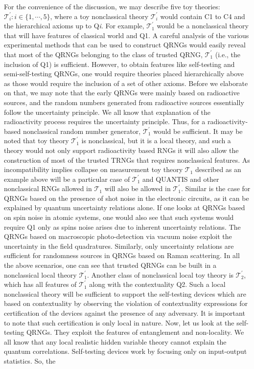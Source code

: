 \documentclass[]{interact}
\theoremstyle{plain}%
\theoremstyle{definition}
\theoremstyle{remark}
\begin{document}
 For the convenience of the discussion, we may describe five toy theories: $\mathcal{T}_{i}^{\prime}:i\in\{1,\cdots,5\}$, where a toy nonclassical theory  $\mathcal{T}_{i}^{\prime}$ would contain C1 to C4 and the hierarchical axioms up to Q\textit{i}. For example, $\mathcal{T}_{1}^{\prime}$ would be a nonclassical theory that will have features of classical world and Q1. A careful analysis of the various experimental methods that can be used to construct QRNGs would easily reveal that most of the QRNGs belonging to the class of trusted QRNG, $\mathcal{T}_{1}^{\prime}$ (i.e., the inclusion of Q1)  is sufficient. However, to obtain features like self-testing and semi-self-testing QRNGs, one would require theories placed hierarchically above as those would require the inclusion of a set of other axioms. Before we elaborate on that, we may note that the early QRNGs were mainly based on radioactive sources, and the random numbers generated from radioactive sources essentially follow the uncertainty principle. We all know that explanation of the radioactivity process requires the uncertainty principle. Thus, for a radioactivity-based nonclassical random number generator,  $\mathcal{T}_{1}^{\prime}$ would be sufficient. It may be noted that toy theory $\mathcal{T}_{1}^{\prime}$ is nonclassical, but it is a local theory, and such a theory would not only support radioactivity based RNGs it will also allow the construction of most of the trusted TRNGs that requires nonclassical features. As incompatibility implies collapse on measurement toy theory $\mathcal{T}_{1}$ described as an example above will be a particular case of $\mathcal{T}_{1}^{\prime}$ and QUANTIS and other nonclassical RNGs allowed in $\mathcal{T}_{1}$ will also be allowed in $\mathcal{T}_{1}^{\prime}$. Similar is the case for QRNGs based on the presence of shot noise in the electronic circuits, as it can be explained by quantum uncertainty relations alone. If one looks at QRNGs based on spin noise in atomic systems, one would also see that such systems would require Q1 only as spins noise arises due to inherent uncertainty relations. The QRNGs based on macroscopic photo-detection via vacuum noise exploit the uncertainty in the field quadratures. Similarly, only uncertainty relations are sufficient for randomness sources in QRNGs based on Raman scattering. In all the above scenarios, one can see that trusted QRNGs can be built in a nonclassical local theory $\mathcal{T}_{1}^{\prime}$. Another class of nonclassical local toy theory is $\mathcal{T}_{2}^{\prime}$, which has all features of $\mathcal{T}_{1}^{\prime}$ along with the contextuality Q2. Such a local nonclassical theory will be sufficient to support the self-testing devices which are based on contextuality  \cite{deng2013exploring,um2013experimental} by observing the violation of contextuality expressions \cite{kochen1975problem} for certification of the devices against the presence of any adversary. It is important to note that such certification is only local in nature. Now, let us look at the self-testing QRNGs. They exploit the features of entanglement and non-locality. We all know that any local realistic hidden variable theory cannot explain the quantum correlations. Self-testing devices work by focusing only on input-output statistics. So, the 
\end{document}
